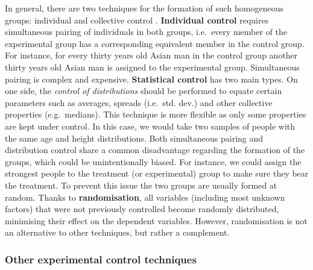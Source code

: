 \documentclass[
]{book}
\begin{document}
In general, there are two techniques for the formation of such homogeneous groups: individual and collective control \citep{bunge2017philosophy}. \textbf{Individual control} requires simultaneous pairing of individuals in both groups, i.e.~every member of the experimental group has a corresponding equivalent member in the control group. For instance, for every thirty years old Asian man in the control group another thirty years old Asian man is assigned to the experimental group. Simultaneous pairing is complex and expensive. \textbf{Statistical control} has two main types. On one side, the \emph{control of distributions} should be performed to equate certain parameters such as averages, spreads (i.e.~std. dev.) and other collective properties (e.g.~medians). This technique is more flexible as only some properties are kept under control. In this case, we would take two samples of people with the same age and height distributions. Both simultaneous pairing and distribution control share a common disadvantage regarding the formation of the groups, which could be unintentionally biased. For instance, we could assign the strongest people to the treatment (or experimental) group to make sure they bear the treatment. To prevent this issue the two groups are usually formed at random. Thanks to \textbf{randomisation}, all variables (including most unknown factors) that were not previously controlled become randomly distributed, minimising their effect on the dependent variables. However, randomisation is not an alternative to other techniques, but rather a complement.

\hypertarget{other-experimental-control-techniques}{%
\subsubsection{Other experimental control techniques}\label{other-experimental-control-techniques}}
\end{document}

